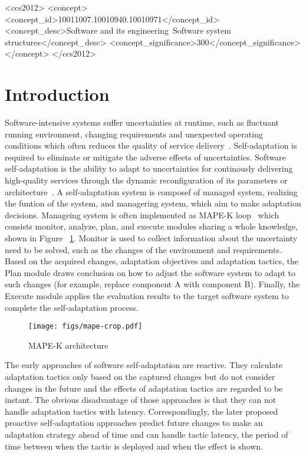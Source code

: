 \documentclass[sigconf]{acmart}
\begin{document}
	\begin{CCSXML}
		<ccs2012>
		<concept>
		<concept_id>10011007.10010940.10010971</concept_id>
		<concept_desc>Software and its engineering~Software system structures</concept_desc>
		<concept_significance>300</concept_significance>
		</concept>
		</ccs2012>
	\end{CCSXML}
	
	\maketitle
	
	\section{Introduction}
	Software-intensive systems suffer uncertainties at runtime, such as fluctuant running environment, changing requirements and unexpected operating conditions which often reduces the quality of service delivery~\cite{filieri2015software}. Self-adaptation is required to eliminate or mitigate the adverse effects of uncertainties. Software self-adaptation is the ability to adapt to uncertainties for continously delivering high-quality services through the dynamic reconfiguration of its parameters or architecture~\cite{calinescu2017engineering}. A self-adaptation system is composef of managed system, realizing the funtion of the system, and managering system, which aim to make adaptation decisions. Manageing system is often implemented as MAPE-K loop~\cite{kephart2003vision} which consists monitor, analyze, plan, and execute modules sharing a whole knowledge, shown in Figure ~\ref{fig:mape}. Monitor is used to collect information about the uncertainty need to be solved, such as the changes of the environment and requirements.  
	Based on the acquired changes, adaptation objectives and adaptation tactics, the Plan module draws conclusion on how to adjust the software system to adapt to such changes (for example, replace component A with component B). Finally, the Execute module applies the evaluation results to the target software system to complete the self-adaptation process.
	\begin{figure}[!htp]
		\centering
		\texttt{[image: figs/mape-crop.pdf]}
		\caption{MAPE-K architecture}
		\label{fig:mape}
	\end{figure}
	
	The early approaches of software self-adaptation are reactive. They calculate adaptation tactics only based on the captured changes but do not consider changes in the future and the effects of adaptation tactics are regarded to be instant. The obvious disadvantage of those approaches is that they can not handle adaptation tactics with latency.  Correspondingly, the later proposed proactive self-adaptation approaches predict future changes to make an adaptation strategy ahead of time and can handle tactic latency, the period of time between when the tactic is deployed and when the effect is shown.
	
\end{document}

